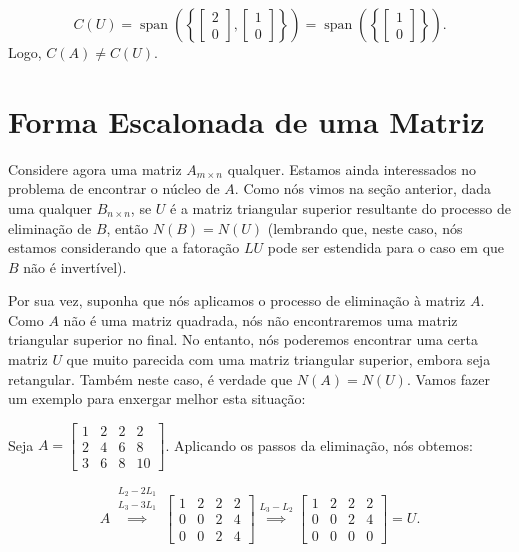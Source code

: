 $$
C(U) = \operatorname{span}\left(\left\{\begin{bmatrix} 2 \\ 0 \end{bmatrix}, \begin{bmatrix} 1 \\ 0 \end{bmatrix}\right\}\right) = \operatorname{span}\left(\left\{\begin{bmatrix} 1 \\ 0 \end{bmatrix}\right\}\right).
$$
Logo, $C(A)\neq C(U)$.

\section{Forma Escalonada de uma Matriz}

Considere agora uma matriz $A_{m\times n}$ qualquer. Estamos ainda interessados no problema de encontrar o núcleo de $A$. Como nós vimos na seção anterior, dada uma qualquer $B_{n\times n}$, se $U$ é a matriz triangular superior resultante do processo de eliminação de $B$, então $N(B) = N(U)$ (lembrando que, neste caso, nós estamos considerando que a fatoração $LU$ pode ser estendida para o caso em que $B$ não é invertível).

Por sua vez, suponha que nós aplicamos o processo de eliminação à matriz $A$. Como $A$ não é uma matriz quadrada, nós não encontraremos uma matriz triangular superior no final. No entanto, nós poderemos encontrar uma certa matriz $U$ que muito parecida com uma matriz triangular superior, embora seja retangular. Também neste caso, é verdade que $N(A) = N(U)$. Vamos fazer um exemplo para enxergar melhor esta situação:

\begin{Example}
	Seja $A = \begin{bmatrix}
		1 & 2 & 2 & 2 \\
		2 & 4 & 6 & 8 \\
		3 & 6 & 8 & 10
	\end{bmatrix}$. Aplicando os passos da eliminação, nós obtemos:
	
	$$
	A\overset{\substack{L_2 - 2L_1 \\ L_3 - 3L_1}}{\implies}
	\begin{bmatrix}
		1 & 2 & 2 & 2 \\
		0 & 0 & 2 & 4 \\
		0 & 0 & 2 & 4
	\end{bmatrix}\overset{L_3 - L_2}{\implies}
	\begin{bmatrix}
		1 & 2 & 2 & 2 \\
		0 & 0 & 2 & 4 \\
		0 & 0 & 0 & 0
	\end{bmatrix} = U.
	$$
\end{Example}

